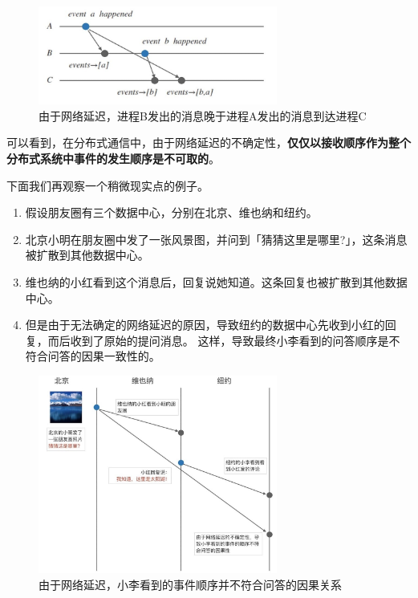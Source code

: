 \documentclass[cn,11pt,chinese]{elegantbook}
\begin{document}
\begin{figure}
    \centering
    \includegraphics[width=0.7\textwidth]{images/appendix-a-01.jpeg}
    \caption{由于网络延迟，进程B发出的消息晚于进程A发出的消息到达进程C}
\end{figure}

可以看到，在分布式通信中，由于网络延迟的不确定性，\textbf{仅仅以接收顺序作为整个分布式系统中事件的发生顺序是不可取的}。

下面我们再观察一个稍微现实点的例子。

\begin{enumerate}
    \item 假设朋友圈有三个数据中心，分别在北京、维也纳和纽约。
    \item 北京小明在朋友圈中发了一张风景图，并问到「猜猜这里是哪里?」，这条消息被扩散到其他数据中心。
    \item 维也纳的小红看到这个消息后，回复说她知道。这条回复也被扩散到其他数据中心。
    \item 但是由于无法确定的网络延迟的原因，导致纽约的数据中心先收到小红的回复，而后收到了原始的提问消息。 这样，导致最终小李看到的问答顺序是不符合问答的因果一致性的。
\end{enumerate}

\begin{figure}
    \centering
    \includegraphics[width=0.7\textwidth]{images/appendix-a-02.jpeg}
    \caption{由于网络延迟，小李看到的事件顺序并不符合问答的因果关系}
\end{figure}
\end{document}
